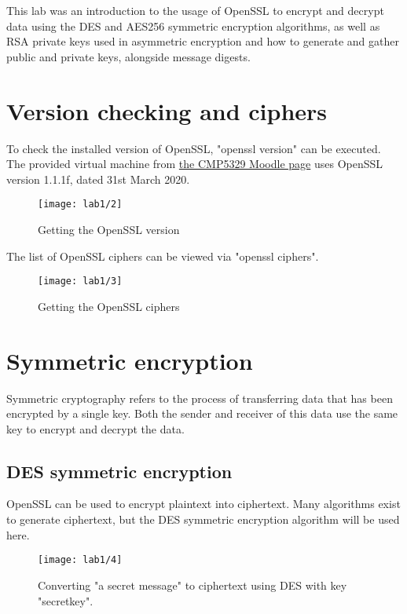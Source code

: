 This lab was an introduction to the usage of OpenSSL to
encrypt and decrypt data using the DES and AES256 symmetric encryption algorithms,
as well as RSA private keys used in asymmetric encryption and how to generate and gather
public and private keys, alongside message digests.

\section{Version checking and ciphers}\label{sec:version}
To check the installed version of OpenSSL, "openssl version" can be executed.
The provided virtual machine from \href{https://moodle.bcu.ac.uk/mod/url/view.php?id=7914090}{the CMP5329 Moodle page}
uses OpenSSL version 1.1.1f, dated 31st March 2020.

\begin{figure}[H]
    \centering
    \texttt{[image: lab1/2]}
    \caption{Getting the OpenSSL version}
    \label{fig:version}
\end{figure}

The list of OpenSSL ciphers can be viewed via "openssl ciphers".

\begin{figure}[H]
    \centering
    \texttt{[image: lab1/3]}
    \caption{Getting the OpenSSL ciphers}
    \label{fig:ciphers}
\end{figure}

\section{Symmetric encryption}\label{sec:symmEncrypt}
Symmetric cryptography refers to the process of transferring data that has been encrypted by a single key.
Both the sender and receiver of this data use the same key to encrypt and decrypt the data.

\subsection{DES symmetric encryption}\label{subsec:des}
OpenSSL can be used to encrypt plaintext into ciphertext.
Many algorithms exist to generate ciphertext, but the DES symmetric encryption algorithm will be used here.

\begin{figure}[H]
    \centering
    \texttt{[image: lab1/4]}
    \caption{Converting "a secret message" to ciphertext using DES with key "secretkey".}
    \label{fig:DESEncrypt}
\end{figure}

